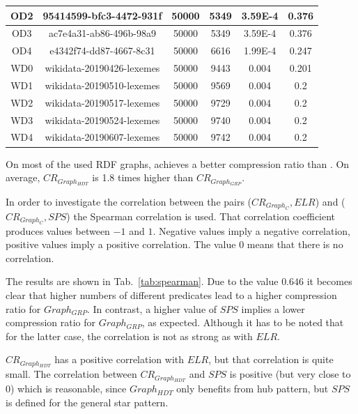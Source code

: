 \begin{center}
\begin{tabular}{|c|c|c|c|c|c|}
		\hline
		OD2 & 95414599-bfc3-4472-931f & 50000 & 5349 & 3.59E-4 & 0.376 \\
		\hline
		OD3 & ac7e4a31-ab86-496b-98a9 & 50000 & 5349 & 3.59E-4 & 0.376 \\
		\hline
		OD4 & e4342f74-dd87-4667-8c31 & 50000 & 6616 & 1.99E-4 & 0.247 \\
		\hline
		\hline
		WD0 & wikidata-20190426-lexemes & 50000 & 9443 & 0.004 & 0.201 \\
		\hline
		WD1 & wikidata-20190510-lexemes & 50000 & 9569 & 0.004 & 0.2 \\
		\hline
		WD2 & wikidata-20190517-lexemes & 50000 & 9729 & 0.004 & 0.2 \\
		\hline
		WD3 & wikidata-20190524-lexemes & 50000 & 9740 & 0.004 & 0.2 \\
		\hline
		WD4 & wikidata-20190607-lexemes & 50000 & 9742 & 0.004 & 0.2 \\
		\hline
	\end{tabular} 
	\label{tab:comparisonDatasets}
\end{center}

\FloatBarrier

On most of the used RDF graphs, \GGRP{} achieves a better compression ratio than \GHDT{}. On average, $CR_{Graph_{HDT}}$ is 1.8 times higher than $CR_{Graph_{GRP}}$.

In order to investigate the correlation between the pairs ($CR_{Graph_C},ELR$) and ($CR_{Graph_C},SPS$) the Spearman correlation is used. That correlation coefficient produces values between $ -1 $ and $ 1 $. Negative values imply a negative correlation, positive values imply a positive correlation. The value 0 means that there is no correlation.~\cite{spearman} 

The results are shown in Tab.~\ref{tab:spearman}. Due to the value $0.646$ it becomes clear that higher numbers of different predicates lead to a higher compression ratio for $Graph_{GRP}$. In contrast, a higher value of $SPS$ implies a lower compression ratio for $Graph_{GRP}$, as expected. Although it has to be noted that for the latter case, the correlation is not as strong as with $ELR$. 

$CR_{Graph_{HDT}}$ has a positive correlation with $ELR$, but that correlation is quite small. The correlation between $CR_{Graph_{HDT}}$ and $SPS$ is positive (but very close  to 0) which is reasonable, since $Graph_{HDT}$ only benefits from hub pattern, but $SPS$ is defined for the general star pattern.

